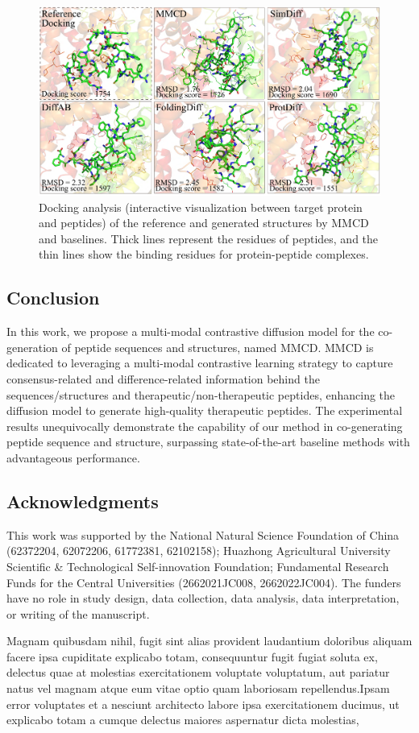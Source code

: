 \documentclass[letterpaper]{article}
\begin{document}
\begin{figure}[ht]
\includegraphics[scale=0.135]{fig4.pdf}
\caption{Docking analysis (interactive visualization between target protein and peptides) of the reference and generated structures by MMCD and baselines. Thick lines represent the residues of peptides, and the thin lines show the binding residues for protein-peptide complexes.}
\end{figure}

\subsection{Conclusion}
In this work, we propose a multi-modal contrastive diffusion model for the co-generation of peptide sequences and structures, named MMCD. MMCD is dedicated to leveraging a multi-modal contrastive learning strategy to capture consensus-related and difference-related information behind the sequences/structures and therapeutic/non-therapeutic peptides, enhancing the diffusion model to generate high-quality therapeutic peptides. The experimental results unequivocally demonstrate the capability of our method in co-generating peptide sequence and structure, surpassing state-of-the-art baseline methods with advantageous performance.

\subsection{Acknowledgments}
This work was supported by the National Natural Science Foundation of China (62372204, 62072206, 61772381, 62102158); Huazhong Agricultural University Scientific \& Technological Self-innovation Foundation; Fundamental Research Funds for the Central Universities (2662021JC008, 2662022JC004). The funders have no role in study design, data collection, data analysis, data interpretation, or writing of the manuscript.

Magnam quibusdam nihil, fugit sint alias provident laudantium doloribus aliquam facere ipsa cupiditate explicabo totam, consequuntur fugit fugiat soluta ex, delectus quae at molestias exercitationem voluptate voluptatum, aut pariatur natus vel magnam atque eum vitae optio quam laboriosam repellendus.Ipsam error voluptates et a nesciunt architecto labore ipsa exercitationem ducimus, ut explicabo totam a cumque delectus maiores aspernatur dicta molestias,

\end{document}
